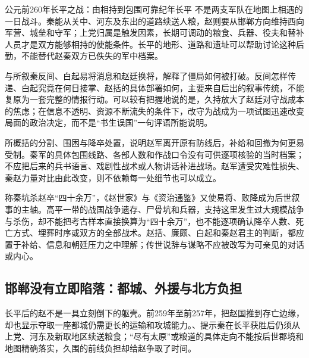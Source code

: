 \begin{event}{公元前260年}{长平之战：由相持到包围}{可靠纪年}{长平}
不是两支军队在地图上相遇的一日战斗。秦能从关中、河东及东出的道路续送人粮，赵则要从邯郸方向维持西向军营、城垒和守军；上党归属是触发因素，长期可调动的粮食、兵器、役夫和替补人员才是双方能够相持的使能条件。长平的地形、道路和遗址可以帮助讨论这种后勤，不能替代赵秦双方已佚失的军中档案。

与所叙秦反间、白起易将消息和赵廷换将，解释了僵局如何被打破。反间怎样传递、白起究竟在何日接掌、赵括的具体部署如何，主要来自后出的叙事传统，不能复原为一套完整的情报行动。可以较有把握地说的是，久持放大了赵廷对守战成本的焦虑；在信息不透明、资源不断流失的条件下，改守为战成为一项试图迅速改变局面的政治决定，而不是“书生误国”一句评语所能说明。

所概括的分割、围困与降卒处置，说明赵军离开原有防线后，补给和回撤为何更易受制。秦军的具体包围线路、各部人数和作战口令没有可供逐项核验的当时档案；不应把后来的兵书语言、戏剧性战术或人物讲话补进战场。赵军遭受灾难性损失、秦赵力量对比由此改变，则不依赖每一处细节也可以成立。
\end{event}

\begin{sourcenote}
称秦坑杀赵卒“四十余万”，《赵世家》与《资治通鉴》又使易将、败降成为后世叙事的主轴。高平一带的战国战争遗存、尸骨坑和兵器，支持这里发生过大规模战争与杀伤，却不能把考古样本直接换算为“四十余万”，也不能逐项确认降卒人数、死亡方式、埋葬时序或双方的全部战术。赵括、廉颇、白起和秦赵君主的判断，都应置于补给、信息和朝廷压力之中理解；传世说辞与谋略不应被改写为可亲见的对话或内心。
\end{sourcenote}



\subsection{邯郸没有立即陷落：都城、外援与北方负担}

长平后的赵不是一具立刻倒下的躯壳。前259年至前257年，把赵国推到存亡边缘，却也显示夺取一座都城仍需更长的运输和攻城能力。、提示秦在长平获胜后仍须从上党、河东及新取地区续送粮食；“尽有太原”或粮道的具体走向不能按后世郡境和地图精确落实，久围的前线负担却给赵争取了时间。

